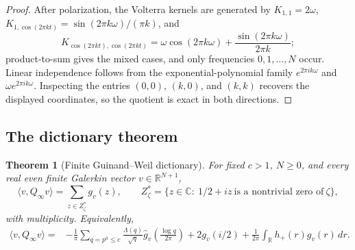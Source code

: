 \documentclass[11pt]{article}
\theoremstyle{plain}
\newtheorem{theorem}{Theorem}[section]
\theoremstyle{definition}
\theoremstyle{remark}
\newcommand{\R}{\mathbb R}
\newcommand{\C}{\mathbb C}
\newcommand{\wh}{\widehat}
\newcommand{\dd}{\,d}
\newcommand{\Qinf}{Q_{\infty}}
\begin{document}
\begin{proof}
After polarization, the Volterra kernels are generated by
$K_{1,1}=2\omega$,
$K_{1,\cos(2\pi kt)}=\sin(2\pi k\omega)/(\pi k)$, and
\[
K_{\cos(2\pi kt),\cos(2\pi kt)}
=\omega\cos(2\pi k\omega)+\frac{\sin(2\pi k\omega)}{2\pi k};
\]
product-to-sum gives the mixed cases, and only frequencies $0,1,\ldots,N$
occur.  Linear independence follows from the exponential-polynomial family
$e^{2\pi ik\omega}$ and $\omega e^{2\pi ik\omega}$.  Inspecting the entries
$(0,0)$, $(k,0)$, and $(k,k)$ recovers the displayed coordinates, so the
quotient is exact in both directions.
\end{proof}

\subsection{The dictionary theorem}

\begin{theorem}[Finite Guinand--Weil dictionary]\label{thm:dictionary}
For fixed $c>1$, $N\ge0$, and every real even finite Galerkin vector
$v\in\R^{N+1}$,
\[
        \langle v,\Qinf v\rangle
        =
        \sum_{z\in Z_\zeta^*}g_v(z),
\qquad
        Z_\zeta^*=\{z\in\C:\ 1/2+iz\ \text{is a nontrivial zero of}\ \zeta\},
\]
with multiplicity.  Equivalently,
\[
\begin{aligned}
\langle v,\Qinf v\rangle
  ={}&-\frac1\pi\sum_{q=p^a\le c}\frac{\Lambda(q)}{\sqrt q}
        \wh g_v\!\left(\frac{\log q}{2\pi}\right)
     +2g_v(i/2)
      +\frac{1}{2\pi}\int_{\R}h_+(r)g_v(r)\dd r .
\end{aligned}
\]
\end{theorem}
\end{document}

